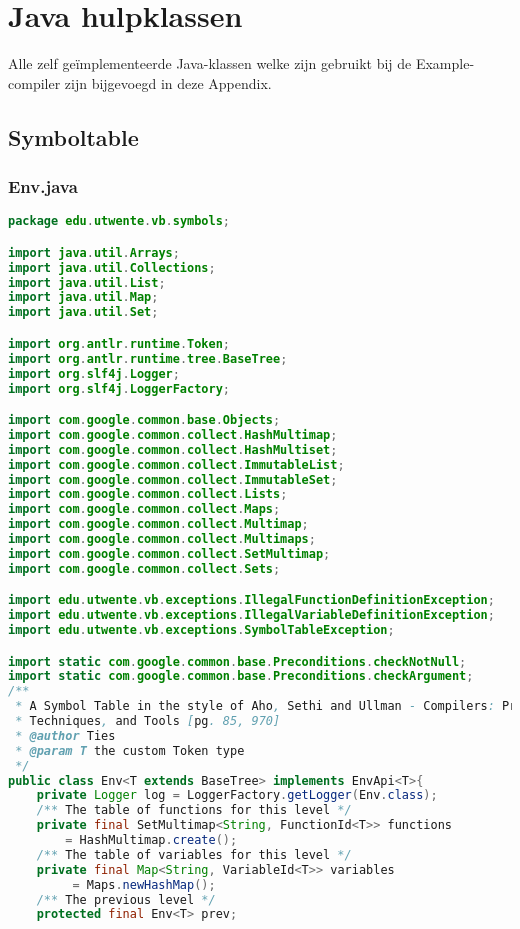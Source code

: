 \chapter{Java hulpklassen}
Alle zelf ge\"{i}mplementeerde Java-klassen welke zijn gebruikt bij de Example-compiler zijn bijgevoegd in deze Appendix.

\section{Symboltable}
\subsection{Env.java}
\begin{lstlisting}[language=Java]
package edu.utwente.vb.symbols;

import java.util.Arrays;
import java.util.Collections;
import java.util.List;
import java.util.Map;
import java.util.Set;

import org.antlr.runtime.Token;
import org.antlr.runtime.tree.BaseTree;
import org.slf4j.Logger;
import org.slf4j.LoggerFactory;

import com.google.common.base.Objects;
import com.google.common.collect.HashMultimap;
import com.google.common.collect.HashMultiset;
import com.google.common.collect.ImmutableList;
import com.google.common.collect.ImmutableSet;
import com.google.common.collect.Lists;
import com.google.common.collect.Maps;
import com.google.common.collect.Multimap;
import com.google.common.collect.Multimaps;
import com.google.common.collect.SetMultimap;
import com.google.common.collect.Sets;

import edu.utwente.vb.exceptions.IllegalFunctionDefinitionException;
import edu.utwente.vb.exceptions.IllegalVariableDefinitionException;
import edu.utwente.vb.exceptions.SymbolTableException;

import static com.google.common.base.Preconditions.checkNotNull;
import static com.google.common.base.Preconditions.checkArgument;
/**
 * A Symbol Table in the style of Aho, Sethi and Ullman - Compilers: Principles, 
 * Techniques, and Tools [pg. 85, 970]
 * @author Ties
 * @param T the custom Token type
 */
public class Env<T extends BaseTree> implements EnvApi<T>{
	private Logger log = LoggerFactory.getLogger(Env.class);
	/** The table of functions for this level */
	private final SetMultimap<String, FunctionId<T>> functions 
        = HashMultimap.create();
	/** The table of variables for this level */
	private final Map<String, VariableId<T>> variables
         = Maps.newHashMap();
	/** The previous level */
	protected final Env<T> prev;
	

\end{lstlisting}
